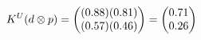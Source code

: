 \documentclass[preview]{standalone}
\begin{document}
\begin{align*}
\special{dvisvgm:raw <g id='unique000'>}K^U(d \otimes p) = \begin{pmatrix} (0.88)(0.81) \\ (0.57)(0.46) \end{pmatrix} = \begin{pmatrix} 0.71 \\ 0.26 \end{pmatrix}\special{dvisvgm:raw </g>}
\end{align*}
\end{document}
